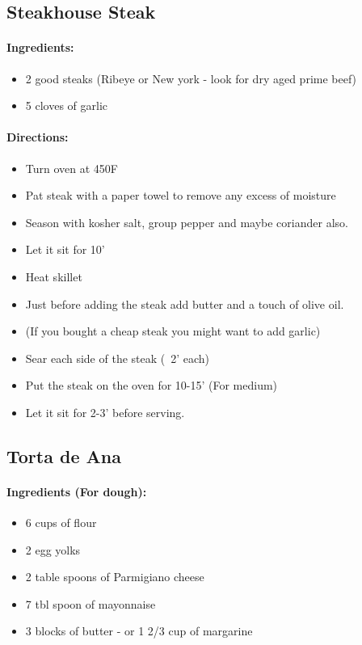 \documentclass{article}
\begin{document}
\subsection{Steakhouse Steak}

\paragraph{Ingredients:}
\begin{itemize}
    \item 2 good steaks (Ribeye or New york - look for dry aged prime beef)
    \item 5 cloves of garlic
\end{itemize}

\paragraph{Directions:}
\begin{itemize}
    \item Turn oven at 450F
    \item Pat steak with a paper towel to remove any excess of moisture
    \item Season with kosher salt, group pepper and maybe coriander also.
    \item Let it sit for 10'
    \item Heat skillet
    \item Just before adding the steak add butter and a touch of olive oil.
    \item (If you bought a cheap steak you might want to add garlic)
    \item Sear each side of the steak (~2' each)
    \item Put the steak on the oven for 10-15' (For medium)
    \item Let it sit for 2-3' before serving.
\end{itemize}

\subsection{Torta de Ana} 

\paragraph{Ingredients (For dough):}
\begin{itemize}
    \item 6 cups of flour
    \item 2 egg yolks
    \item 2 table spoons of Parmigiano cheese
    \item 7 tbl spoon of mayonnaise
    \item 3 blocks of butter - or 1 2/3 cup of margarine
\end{itemize}  
\end{document}
